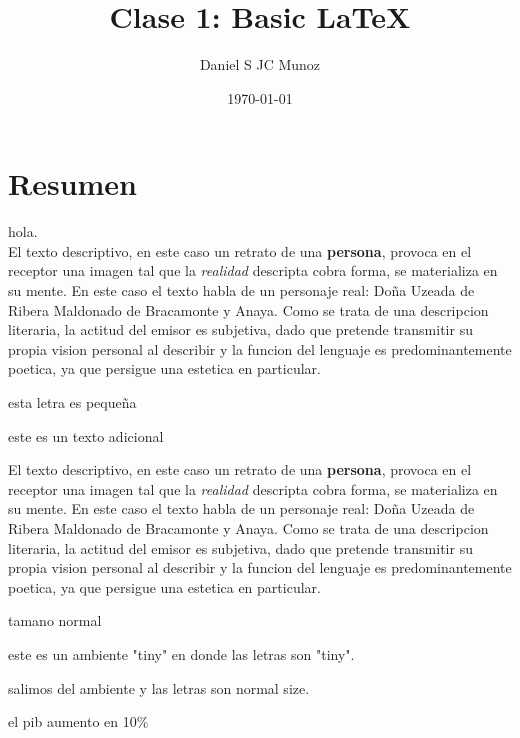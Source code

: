 \documentclass[12pt, a4paper]{article} %
\title{Clase 1: Basic \LaTeX}
\author{Daniel S \hspace{0.05cm} JC Munoz}
\date{\today}
\begin{document}

\maketitle

\tableofcontents

\clearpage

\section{Resumen}
hola. 
\\ %

El texto descriptivo, en este caso un retrato de una \textbf{persona}, provoca en el receptor una imagen tal que la \textit{realidad} descripta cobra forma, se materializa en su mente. En este caso el texto habla de un personaje real: Doña Uzeada de Ribera Maldonado de Bracamonte y Anaya. Como se trata de una descripcion literaria, la actitud del emisor es subjetiva, dado que pretende transmitir su propia vision personal al describir y la funcion del lenguaje es predominantemente poetica, ya que persigue una estetica en particular.

\large
esta letra es pequeña

este es un texto adicional

El texto descriptivo, en este caso un retrato de una \textbf{persona}, provoca en el receptor una imagen tal que la \textit{realidad} descripta cobra forma, se materializa en su mente. En este caso el texto habla de un personaje real: Doña Uzeada de Ribera Maldonado de Bracamonte y Anaya. Como se trata de una descripcion literaria, la actitud del emisor es subjetiva, dado que pretende transmitir su propia vision personal al describir y la funcion del lenguaje es predominantemente poetica, ya que persigue una estetica en particular.

\normalsize

tamano normal

\begin{tiny}
    este es un ambiente "tiny" en donde las letras son "tiny". 
\end{tiny}

salimos del ambiente y las letras son normal size. 


el pib aumento en 10\%
\end{document}
